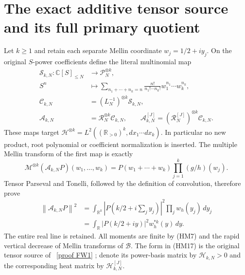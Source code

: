 \documentclass[11pt]{article}
\newcommand{\C}{\mathbb C}\newcommand{\R}{\mathbb R}
\newcommand{\B}{\mathscr B}\newcommand{\M}{\mathcal M}
\newcommand{\PP}{\mathcal P}\newcommand{\Hh}{\mathcal H}
\newcommand{\norm}[1]{\left\lVert#1\right\rVert}
\begin{document}
\section{The exact additive tensor source and its full primary quotient}
Let $k\ge1$ and retain each separate Mellin coordinate $w_j=1/2+iy_j$.
On the original $S$-power coefficients define the literal multinomial map
\begin{equation}\tag{HM15}
 \begin{aligned}
 \mathcal S_{k,N}:\C[S]_{\le N}&\longrightarrow\PP_N^{\otimes k},\\
 S^n&\longmapsto
 \sum_{n_1+\cdots+n_k=n}\frac{n!}{n_1!\cdots n_k!}
                     w_1^{n_1}\cdots w_k^{n_k},\\
 \mathcal C_{k,N}&=(L_N^{-1})^{\otimes k}\mathcal S_{k,N},\\
 \mathcal A_{k,N}&=\mathcal R_N^{\otimes k}\mathcal C_{k,N},\qquad
 \mathcal A_{k,N}^{[J]}=(\mathcal R_N^{[J]})^{\otimes k}\mathcal C_{k,N}.
 \end{aligned}
\end{equation}
These maps target $\Hh^{\otimes k}=L^2((\R_{>0})^k,dx_1\cdots dx_k)$.
In particular no new product, root polynomial or coefficient normalization
is inserted. The multiple Mellin transform of the first map is exactly
\begin{equation}\tag{HM16}
 \M^{\otimes k}(\mathcal A_{k,N}P)(w_1,\ldots,w_k)
       =P(w_1+\cdots+w_k)\prod_{j=1}^k(g/h)(w_j).
\end{equation}
Tensor Parseval and Tonelli, followed by the definition of convolution,
therefore prove
\begin{equation}\tag{HM17}
 \begin{aligned}
 \norm{\mathcal A_{k,N}P}^2
 &=\int_{\R^k}|P(k/2+i\textstyle\sum_jy_j)|^2
                                  \prod_j w_h(y_j)\,dy_j\\
 &=\int_\R|P(k/2+iy)|^2w_h^{*k}(y)\,dy.
 \end{aligned}
\end{equation}
The entire real line is retained. All moments are finite by (HM7) and
the rapid vertical decrease of Mellin transforms of $\B$. The form in
(HM17) is the original tensor source of \cite{fullwindow}%
~\href{https://github.com/KokunoYumeto/zeta-function-research-reader/blob/5992ad50c0f2a06921f1fcaded7b4e38097c0739/workbenches/splitzero-tandem/continuations/20260920-original-kernel-mixed-determinants/providers/FULL_WINDOW_SOURCE_PRODUCTS.tex\#L28}{[proof FW1]}%
{}; denote its
power-basis matrix by $\mathcal H_{k,N}>0$ and the corresponding heat
matrix by $\mathcal H_{k,N}^{[J]}$.
\end{document}
